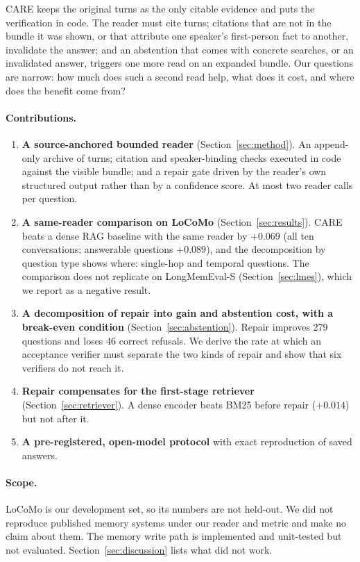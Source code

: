 \documentclass[10pt]{article}
\theoremstyle{plain}
\newcommand{\care}{\textsc{CARE}}
\begin{document}
\care{} keeps the original turns as the only citable evidence and puts the verification in code. The reader must
cite turns; citations that are not in the bundle it was shown, or that attribute one speaker's first-person fact to
another, invalidate the answer; and an abstention that comes with concrete searches, or an invalidated answer,
triggers one more read on an expanded bundle. Our questions are narrow: how much does such a second read help, what
does it cost, and where does the benefit come from?

\paragraph{Contributions.}
\begin{enumerate}
  \item \textbf{A source-anchored bounded reader} (Section~\ref{sec:method}). An append-only archive of turns;
  citation and speaker-binding checks executed in code against the visible bundle; and a repair gate driven by the
  reader's own structured output rather than by a confidence score. At most two reader calls per question.
  \item \textbf{A same-reader comparison on LoCoMo} (Section~\ref{sec:results}). \care{} beats a dense RAG baseline
  with the same reader by $+0.069$ (all ten conversations; answerable questions $+0.089$), and the decomposition by
  question type shows where: single-hop and temporal questions. The comparison does not replicate on
  LongMemEval-S (Section~\ref{sec:lmes}), which we report as a negative result.
  \item \textbf{A decomposition of repair into gain and abstention cost, with a break-even condition}
  (Section~\ref{sec:abstention}). Repair improves 279 questions and loses 46 correct refusals. We derive the rate at
  which an acceptance verifier must separate the two kinds of repair and show that six verifiers do not reach it.
  \item \textbf{Repair compensates for the first-stage retriever} (Section~\ref{sec:retriever}). A dense encoder
  beats BM25 before repair ($+0.014$) but not after it.
  \item \textbf{A pre-registered, open-model protocol} with exact reproduction of saved answers.
\end{enumerate}

\paragraph{Scope.} LoCoMo is our development set, so its numbers are not held-out. We did not reproduce published
memory systems under our reader and metric and make no claim about them. The memory write path is implemented and
unit-tested but not evaluated. Section~\ref{sec:discussion} lists what did not work.
\end{document}
